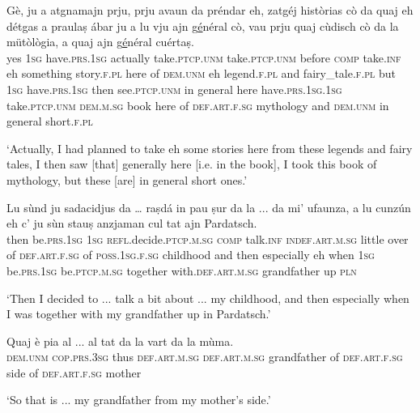 \begin{linenumbers}
\gll Gè, ju a atgnamajn prju, prju avaun da préndar eh, zatgéj històrias cò da quaj eh détgas a praulaṣ ábar ju a lu vju ajn g\underline{é}néral cò, vau prju quaj cùdisch cò da la mütòlògia\footnotemark, a quaj ajn g\underline{é}néral cuértaṣ.\\
yes \textsc{1sg} have.\textsc{prs.1sg} actually take.\textsc{ptcp.unm} take.\textsc{ptcp.unm} before \textsc{comp} take.\textsc{inf} eh something story.\textsc{f.pl} here of \textsc{dem.unm} eh legend.\textsc{f.pl} and fairy\_tale.\textsc{f.pl} but \textsc{1sg} have.\textsc{prs.1sg} then see.\textsc{ptcp.unm} in general here have.\textsc{prs.1sg.1sg} take.\textsc{ptcp.unm}  \textsc{dem.m.sg} book here of \textsc{def.art.f.sg} mythology and  \textsc{dem.unm} in general short.\textsc{f.pl} \\
\end{linenumbers}
\medskip
\glt `Actually, I had planned to take eh some stories here from these legends and fairy tales, I then saw [that] generally here [i.e. in the book], I took this book of mythology, but these [are] in general short ones.'
\medskip

\begin{linenumbers}
\gll Lu sùnd ju sadacidjus da … raṣdá in pau ṣur da la ... da mi’ ufaunza, a lu cunzún eh c’ ju sùn stauṣ anzjaman cul tat ajn Pardatsch.\\
then be.\textsc{prs.1sg}  \textsc{1sg}  \textsc{refl}.decide.\textsc{ptcp.m.sg}  \textsc{comp} {} talk.\textsc{inf} \textsc{indef.art.m.sg} little over of  \textsc{def.art.f.sg} {} of  \textsc{poss.1sg.f.sg} childhood and then especially eh when \textsc{1sg}  be.\textsc{prs.1sg}  be.\textsc{ptcp.m.sg} together with.\textsc{def.art.m.sg} grandfather up \textsc{pln}\\
\end{linenumbers}
\medskip
\glt `Then I decided to ... talk a bit about ... my childhood, and then especially when I was together with my grandfather up in Pardatsch.'
\medskip

\begin{linenumbers}
\gll  Quaj è pia al ... al tat da la vart da la mùma. \\
    \textsc{dem.unm} \textsc{cop.prs.3sg} thus \textsc{def.art.m.sg} {} \textsc{def.art.m.sg} grandfather of \textsc{def.art.f.sg} side of \textsc{def.art.f.sg} mother\\
\end{linenumbers}
\medskip
\glt `So that is ... my grandfather from my mother’s side.'
\medskip

